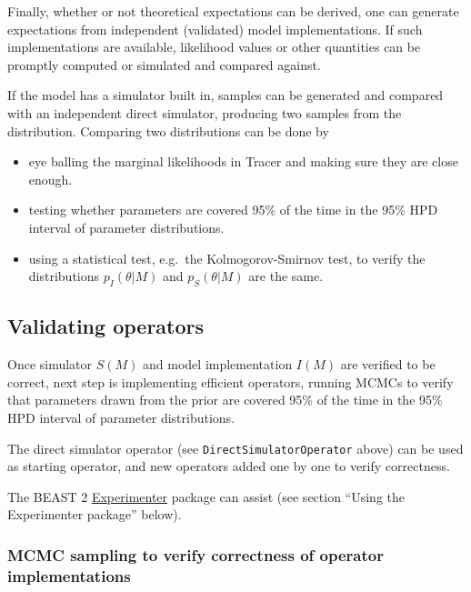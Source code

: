 \documentclass[oneside]{article}
\begin{document}
Finally, whether or not theoretical expectations can be
derived, one can generate expectations from independent (validated) model implementations.
If such implementations are available, likelihood values or other
quantities can be promptly computed or simulated and compared against.








If the model has a simulator built in, samples can be generated and compared with an 
independent direct simulator, producing two samples from the distribution. Comparing 
two distributions can be done by

\begin{itemize}
\item
  eye balling the marginal likelihoods in Tracer and making sure they
  are close enough.
\item
  testing whether parameters are covered 95\% of the time in the 95\%
  HPD interval of parameter distributions.
\item
  using a statistical test, e.g.~the Kolmogorov-Smirnov test, to verify
  the distributions \(p_I(\theta|M)\) and \(p_S(\theta|M)\) are the
  same.
\end{itemize}


\subsection{Validating operators}

Once simulator \(S(M)\) and model implementation \(I(M)\) are verified
to be correct, next step is implementing efficient operators, running
MCMCs to verify that parameters drawn from the prior are covered 95\% of
the time in the 95\% HPD interval of parameter distributions.

The direct simulator operator (see \texttt{DirectSimulatorOperator}
above) can be used as starting operator, and new operators added one by
one to verify correctness.

The BEAST 2
\href{https://github.com/rbouckaert/Experimenter}{Experimenter} package
can assist (see section ``Using the Experimenter package'' below).

\subsubsection{MCMC sampling to verify correctness of operator
implementations}\label{mcmc-sampling-to-verify-correctness-of-operator-implementations}
\end{document}
